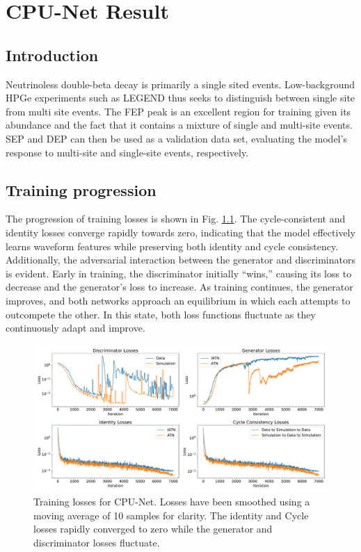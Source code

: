 \chapter{CPU-Net Result}\label{chap:cpu-net_result}

\section{Introduction}

Neutrinoless double-beta decay is primarily a single sited events. Low-background HPGe experiments such as LEGEND thus seeks to distinguish between single site from multi site events. The FEP peak is an excellent region for training given its abundance and the fact that it contains a mixture of single and multi-site events. SEP and DEP can then be used as a validation data set, evaluating the model's response to multi-site and single-site events, respectively.


\section{Training progression}
The progression of training losses is shown in Fig. \ref{fig:training_loss}. The cycle-consistent and identity losses converge rapidly towards zero, indicating that the model effectively learns waveform features while preserving both identity and cycle consistency. Additionally, the adversarial interaction between the generator and discriminators is evident. Early in training, the discriminator initially “wins,” causing its loss to decrease and the generator’s loss to increase. As training continues, the generator improves, and both networks approach an equilibrium in which each attempts to outcompete the other. In this state, both loss functions fluctuate as they continuously adapt and improve.


\begin{figure}%
    \includegraphics[width=0.99\linewidth]{ch8/figs/loss_funcs.pdf}
    \caption{Training losses for CPU-Net. Losses have been smoothed using a moving average of 10 samples for clarity. The identity and Cycle losses rapidly converged to zero while the generator and discriminator losses fluctuate.} 
   \label{fig:training_loss}
\end{figure}

